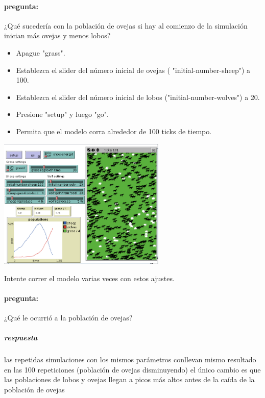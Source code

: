 \documentclass[12pt,letterpaper]{article}
\begin{document}
\begin{itemize}
	\paragraph{pregunta:}
		¿Qué sucedería con la población de ovejas si hay al comienzo de la simulación inician más ovejas y menos lobos?
		
		\begin{itemize}
			\item Apague "grass".
			\item Establezca el slider del número inicial de ovejas ( "initial-number-sheep") a 100.
			\item Establezca el slider del número inicial de lobos ("initial-number-wolves") a 20.
			\item Presione "setup" y luego "go".
			\item Permita que el modelo corra alrededor de 100 ticks de tiempo.

		\end{itemize}
		
		\begin{center}
				\includegraphics[width=8cm]{./imagenes/image7.png}
		\end{center}
		
	Intente correr el modelo varias veces con estos ajustes.
	
	\paragraph{pregunta:}
		¿Qué le ocurrió a la población de ovejas?
		
	\subparagraph{respuesta}
		las repetidas simulaciones con los mismos parámetros conllevan  mismo resultado en las 100 repeticiones (población de ovejas disminuyendo) el único cambio es que las poblaciones de lobos y ovejas llegan a picos más altos antes de la caída de la población de ovejas
		

\end{itemize}
\end{document}
